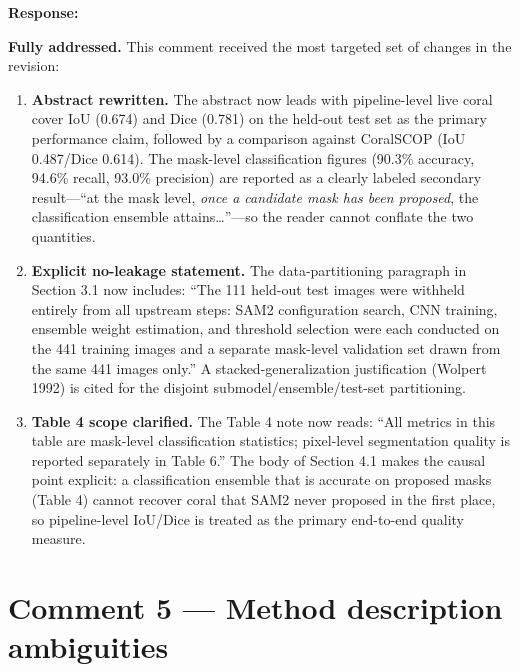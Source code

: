 \documentclass[12pt]{article}
\newenvironment{response}{%
  \vspace{4pt}%
  \color{respblue}%
  \noindent\textbf{Response:}\space
}{%
  \vspace{10pt}%
}
\begin{document}
\begin{response}
\textbf{Fully addressed.}  This comment received the most targeted set of
changes in the revision:

\begin{enumerate}[topsep=2pt,itemsep=3pt]
  \item \textbf{Abstract rewritten.}  The abstract now leads with
    pipeline-level live coral cover IoU (0.674) and Dice (0.781) on the
    held-out test set as the primary performance claim, followed by a
    comparison against CoralSCOP (IoU 0.487/Dice 0.614).  The mask-level
    classification figures (90.3\% accuracy, 94.6\% recall, 93.0\% precision)
    are reported as a clearly labeled secondary result---``at the mask level,
    \emph{once a candidate mask has been proposed}, the classification ensemble
    attains\ldots''---so the reader cannot conflate the two quantities.

  \item \textbf{Explicit no-leakage statement.}  The data-partitioning
    paragraph in Section 3.1 now includes: ``The 111 held-out test images were
    withheld entirely from all upstream steps: SAM2 configuration search, CNN
    training, ensemble weight estimation, and threshold selection were each
    conducted on the 441 training images and a separate mask-level validation
    set drawn from the same 441 images only.''  A stacked-generalization
    justification (Wolpert 1992) is cited for the disjoint
    submodel/ensemble/test-set partitioning.

  \item \textbf{Table 4 scope clarified.}  The Table 4 note now reads: ``All
    metrics in this table are mask-level classification statistics; pixel-level
    segmentation quality is reported separately in Table 6.''  The body of
    Section 4.1 makes the causal point explicit: a classification ensemble
    that is accurate on proposed masks (Table 4) cannot recover coral that
    SAM2 never proposed in the first place, so pipeline-level IoU/Dice is
    treated as the primary end-to-end quality measure.
\end{enumerate}
\end{response}

\section*{Comment 5 --- Method description ambiguities}
\end{document}
